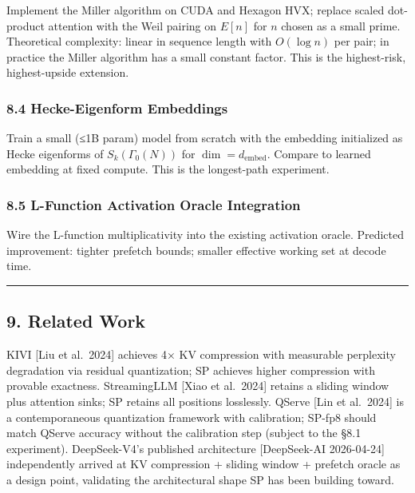 \documentclass[
  11pt,
]{article}
\begin{document}
Implement the Miller algorithm on CUDA and Hexagon HVX; replace scaled
dot-product attention with the Weil pairing on \(E[n]\) for \(n\) chosen
as a small prime. Theoretical complexity: linear in sequence length with
\(O(\log n)\) per pair; in practice the Miller algorithm has a small
constant factor. This is the highest-risk, highest-upside extension.

\hypertarget{hecke-eigenform-embeddings}{%
\subsubsection{8.4 Hecke-Eigenform
Embeddings}\label{hecke-eigenform-embeddings}}

Train a small (≤1B param) model from scratch with the embedding
initialized as Hecke eigenforms of \(S_k(\Gamma_0(N))\) for
\(\dim = d_{\mathrm{embed}}\). Compare to learned embedding at fixed
compute. This is the longest-path experiment.

\hypertarget{l-function-activation-oracle-integration}{%
\subsubsection{8.5 L-Function Activation Oracle
Integration}\label{l-function-activation-oracle-integration}}

Wire the L-function multiplicativity into the existing activation
oracle. Predicted improvement: tighter prefetch bounds; smaller
effective working set at decode time.

\begin{center}\rule{0.5\linewidth}{0.5pt}\end{center}

\hypertarget{related-work}{%
\subsection{9. Related Work}\label{related-work}}

KIVI {[}Liu et al.~2024{]} achieves 4× KV compression with measurable
perplexity degradation via residual quantization; SP achieves higher
compression with provable exactness. StreamingLLM {[}Xiao et al.~2024{]}
retains a sliding window plus attention sinks; SP retains all positions
losslessly. QServe {[}Lin et al.~2024{]} is a contemporaneous
quantization framework with calibration; SP-fp8 should match QServe
accuracy without the calibration step (subject to the §8.1 experiment).
DeepSeek-V4's published architecture {[}DeepSeek-AI 2026-04-24{]}
independently arrived at KV compression + sliding window + prefetch
oracle as a design point, validating the architectural shape SP has been
building toward.
\end{document}
